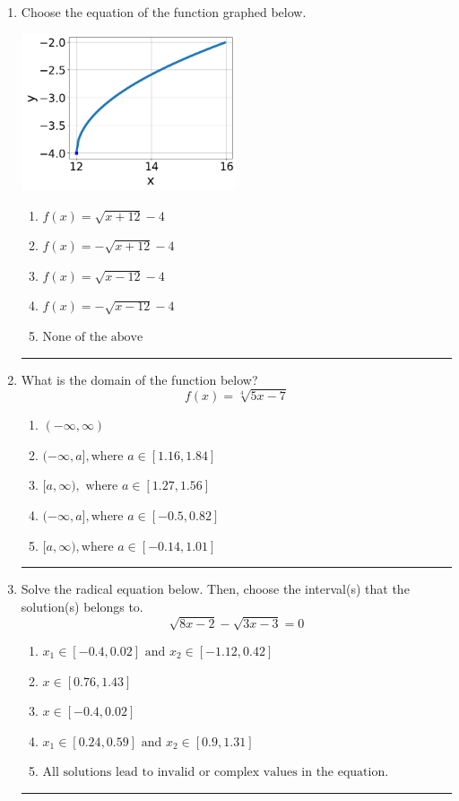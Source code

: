 \documentclass[14pt]{extbook}
\newcommand{\litem}[1]{\item#1\hspace*{-1cm}\rule{\textwidth}{0.4pt}}
\begin{document}
\begin{enumerate}
\litem{
Choose the equation of the function graphed below.
\begin{center}
    \includegraphics[width=0.5\textwidth]{../Figures/radicalGraphToEquationCopyC.png}
\end{center}
\begin{enumerate}[label=\Alph*.]
\item \( f(x) = \sqrt{x + 12} - 4 \)
\item \( f(x) = - \sqrt{x + 12} - 4 \)
\item \( f(x) = \sqrt{x - 12} - 4 \)
\item \( f(x) = - \sqrt{x - 12} - 4 \)
\item \( \text{None of the above} \)

\end{enumerate} }
\litem{
What is the domain of the function below?\[ f(x) = \sqrt[4]{5 x - 7} \]\begin{enumerate}[label=\Alph*.]
\item \( (-\infty, \infty) \)
\item \( (-\infty, a], \text{where } a \in [1.16, 1.84] \)
\item \( [a, \infty), \text{ where } a \in [1.27, 1.56] \)
\item \( (-\infty, a], \text{where } a \in [-0.5, 0.82] \)
\item \( [a, \infty), \text{where } a \in [-0.14, 1.01] \)

\end{enumerate} }
\litem{
Solve the radical equation below. Then, choose the interval(s) that the solution(s) belongs to.\[ \sqrt{8 x - 2} - \sqrt{3 x - 3} = 0 \]\begin{enumerate}[label=\Alph*.]
\item \( x_1 \in [-0.4, 0.02] \text{ and } x_2 \in [-1.12,0.42] \)
\item \( x \in [0.76,1.43] \)
\item \( x \in [-0.4,0.02] \)
\item \( x_1 \in [0.24, 0.59] \text{ and } x_2 \in [0.9,1.31] \)
\item \( \text{All solutions lead to invalid or complex values in the equation.} \)


\end{enumerate}}
\end{enumerate}
\end{document}
